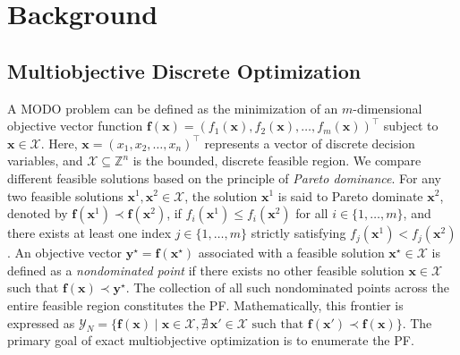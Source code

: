 \documentclass[letterpaper]{article}
\begin{document}
\section{Background}
\label{sec:prelim}
\subsection{Multiobjective Discrete Optimization}
\label{sec:prelim_modo}
A MODO problem can be defined as the minimization of an $m$-dimensional objective vector function $\mathbf{f}(\mathbf{x}) = (f_1(\mathbf{x}), f_2(\mathbf{x}), \dots, f_m(\mathbf{x}))^\top$ subject to $\mathbf{x} \in \mathcal{X}$. Here, $\mathbf{x} = (x_1, x_2, \dots, x_n)^\top$ represents a vector of discrete decision variables, and $\mathcal{X} \subseteq \mathbb{Z}^n$ is the bounded, discrete feasible region. We compare different feasible solutions based on the principle of \emph{Pareto dominance}. For any two feasible solutions $\mathbf{x}^1, \mathbf{x}^2 \in \mathcal{X}$, the solution $\mathbf{x}^1$ is said to Pareto dominate $\mathbf{x}^2$, denoted by $\mathbf{f}(\mathbf{x}^1) \prec \mathbf{f}(\mathbf{x}^2)$, if $f_i(\mathbf{x}^1) \le f_i(\mathbf{x}^2)$ for all $i \in \{1, \dots, m\}$, and there exists at least one index $j \in \{1, \dots, m\}$ strictly satisfying $f_j(\mathbf{x}^1) < f_j(\mathbf{x}^2)$.
An objective vector $\mathbf{y}^\star = \mathbf{f}(\mathbf{x}^\star)$ associated with a feasible solution $\mathbf{x}^\star \in \mathcal{X}$ is defined as a \emph{nondominated point} if there exists no other feasible solution $\mathbf{x} \in \mathcal{X}$ such that $\mathbf{f}(\mathbf{x}) \prec \mathbf{y}^\star$. The collection of all such nondominated points across the entire feasible region constitutes the PF. Mathematically, this frontier is expressed as $\mathcal{Y}_N = \{\mathbf{f}(\mathbf{x}) \mid \mathbf{x} \in \mathcal{X}, \nexists \, \mathbf{x}' \in \mathcal{X} \text{ such that } \mathbf{f}(\mathbf{x}') \prec \mathbf{f}(\mathbf{x})\}$. The primary goal of exact multiobjective optimization is to enumerate the PF.
\end{document}
